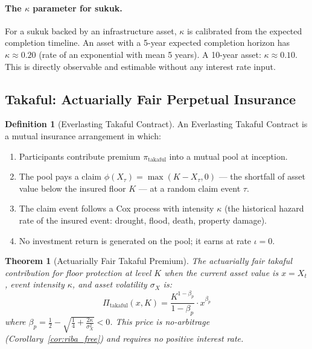 \documentclass[10pt,twocolumn]{article}
\theoremstyle{plain}
\newtheorem{theorem}{Theorem}
\theoremstyle{definition}
\newtheorem{definition}{Definition}
\begin{document}
\paragraph{The $\kappa$ parameter for sukuk.}
For a sukuk backed by an infrastructure asset, $\kappa$ is
calibrated from the expected completion timeline. An asset with
a 5-year expected completion horizon has $\kappa \approx 0.20$
(rate of an exponential with mean 5 years). A 10-year asset:
$\kappa \approx 0.10$. This is directly observable and
estimable without any interest rate input.

\subsection{Takaful: Actuarially Fair Perpetual Insurance}
\label{sec:takaful}

\begin{definition}[Everlasting Takaful Contract]
An Everlasting Takaful Contract is a mutual insurance arrangement
in which:
\begin{enumerate}[leftmargin=*,noitemsep]
\item Participants contribute premium $\pi_\mathrm{takaful}$
into a mutual pool at inception.
\item The pool pays a claim $\phi(X_\tau) = \max(K - X_\tau, 0)$
--- the shortfall of asset value below the insured floor $K$
--- at a random claim event $\tau$.
\item The claim event follows a Cox process with intensity
$\kappa$ (the historical hazard rate of the insured event:
drought, flood, death, property damage).
\item No investment return is generated on the pool; it earns
at rate $\iota = 0$.
\end{enumerate}
\end{definition}

\begin{theorem}[Actuarially Fair Takaful Premium]
\label{thm:takaful}
The actuarially fair takaful contribution for floor protection
at level $K$ when the current asset value is $x = X_t$, event
intensity $\kappa$, and asset volatility $\sigma_X$ is:
\begin{equation}
\boxed{\Pi_\mathrm{takaful}(x, K)
= \frac{K^{1-\beta_p}}{1-\beta_p}\cdot x^{\beta_p}}
\label{eq:takaful_premium}
\end{equation}
where $\beta_p = \frac{1}{2} - \sqrt{\frac{1}{4}
+ \frac{2\kappa}{\sigma_X^2}} < 0$.
This price is no-arbitrage (Corollary~\textup{\ref{cor:riba_free}})
and requires no positive interest rate.
\end{theorem}
\end{document}
